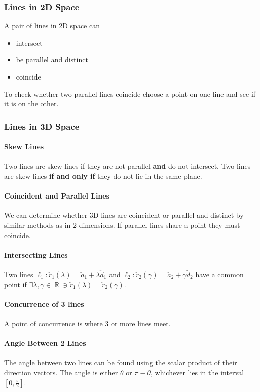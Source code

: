 \documentclass[a4paper,twoside,10pt]{article}
\DeclareMathOperator\R{\mathbb{R}}
\begin{document}
			\subsubsection{Lines in 2D Space} A pair of lines in 2D space can
			\begin{itemize}
				\item intersect
				\item be parallel and distinct
				\item coincide
			\end{itemize}
			To check whether two parallel lines coincide choose a point on one line and see if it is on the other.
			
			\subsubsection{Lines in 3D Space}
				\paragraph{Skew Lines} Two lines are skew lines if they are not parallel \textbf{and} do not intersect. Two lines are skew lines \textbf{if and only if} they do not lie in the same plane.
				
				\paragraph{Coincident and Parallel Lines} We can determine whether 3D lines are coincident or parallel and distinct by similar methods as in 2 dimensions. If parallel lines share a point they must coincide.
				
				\paragraph{Intersecting Lines} Two lines $\ell_1:\utilde{r}_1(\lambda)=\utilde{a}_1+\lambda\utilde{d}_1$ and $\ell_2:\utilde{r}_2(\gamma)=\utilde{a}_2+\gamma\utilde{d}_2$ have a common point if $\exists\lambda,\gamma\in\R\ni\utilde{r}_1(\lambda)=\utilde{r}_2(\gamma)$.
				
				\paragraph{Concurrence of 3 lines} A point of concurrence is where 3 or more lines meet.
				
				\paragraph{Angle Between 2 Lines} The angle between two lines can be found using the scalar product of their direction vectors. The angle is either $\theta$ or $\pi-\theta$, whichever lies in the interval $[0,\frac{\pi}{2}]$.
\end{document}
